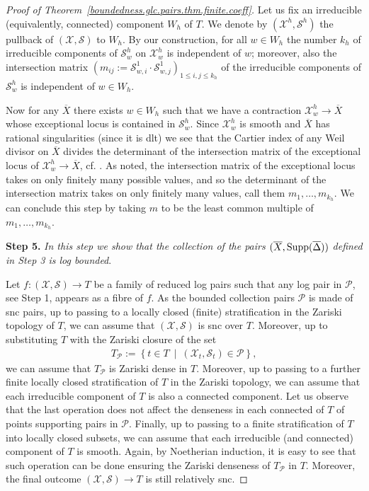 \documentclass[12pt, a4paper]{amsart}
\newcounter{Theorem}
\theoremstyle{definition}
\theoremstyle{named}
\begin{document}
\begin{proof}[Proof of Theorem~\ref{boundedness.glc.pairs.thm.finite.coeff}]
Let us fix an irreducible (equivalently,  connected) component
$W_h$
of 
$T$.
We denote by 
$(\mathcal X^h, \mathcal S^h)$
the pullback of 
$(\mathcal X, \mathcal S)$
to 
$W_h$.
By our construction, for all 
$w \in W_h$
the number 
$k_{h}$ 
of irreducible components of 
$\mathcal S^h_{w}$
on 
$\mathcal X^h_{w}$
is independent of 
$w$;
moreover, also the intersection matrix 
$(m_{ij}:=
\mathcal S^1_{w, i} \cdot \mathcal S^1_{w,  j})_
{1\leq i, j \leq k_{h}}$
of the irreducible components of 
$\mathcal S^h_w$ 
is independent of 
$w \in W_h$.

Now for any $\overline{X}$ there exists $w \in W_h$ such that we have a contraction $\mathcal X^h_w \to \overline{X}$ whose exceptional locus is contained 
in $\mathcal S^h_w$.
Since $\mathcal X^h_w$ is smooth and $\overline{X}$ has rational singularities (since it is dlt) we see that the Cartier index of any Weil divisor on $\overline{X}$
divides the determinant of the intersection matrix of the exceptional locus of $\mathcal X^h_w \to \overline{X}$, cf. \cite[Theorem 4.6]{MR1805816}.  As noted, the intersection matrix of the exceptional locus takes on only finitely many possible values, and so the determinant of the intersection matrix takes on only finitely many values, call them $m_1, \dots, m_{k_h}$.  We can conclude this step by taking $m$ to be the least common multiple of $m_1, \dots, m_{k_h}$. 


\iffalse
{\bf Step 5.}
{\it 
In this step we show that the collection of the pairs
$(\overline{X}, {\rm Supp}(\overline \Delta))$
defined in Step 3 is log bounded}.


Let  
$f \colon (\mathcal X, \mathcal S) \to T$
be a family of reduced log pairs such that any log pair in
$\mathcal P$, see Step 1, appears as a fibre of $f$.
As the bounded collection pairs $\mathcal P$ is made of snc pairs, up to passing to a locally closed (finite) stratification in the Zariski topology of $T$, 
we can assume that 
$(\mathcal X, \mathcal S)$
is snc over 
$T$.
Moreover, up to substituting 
$T$ with the Zariski closure of the set
\begin{align*}
T_{\mathcal P} :=
    \left \{
t \in T \ 
\middle \vert \
(\mathcal X_t, \mathcal S_t) \in \mathcal P
    \right \}, 
\end{align*}
we can assume that 
$T_{\mathcal P}$ 
is Zariski dense in 
$T$.
Moreover, up to passing to a further finite locally closed stratification of 
$T$ 
in the Zariski topology, we can assume that each irreducible component of 
$T$
is also a connected component.
Let us observe that the last operation does not affect the denseness in each connected of $T$ of points supporting pairs in $\mathcal P$.
Finally, up to passing to a finite stratification of $T$ into locally closed subsets, we can assume that each irreducible (and connected) component of 
$T$
is smooth.
Again, by Noetherian induction, it is easy to see that such operation can be done ensuring the Zariski denseness of 
$T_{\mathcal P}$ 
in 
$T$.
Moreover, the final outcome 
$(\mathcal X, \mathcal S) \to T$ 
is still relatively snc.


\end{proof}
\end{document}
